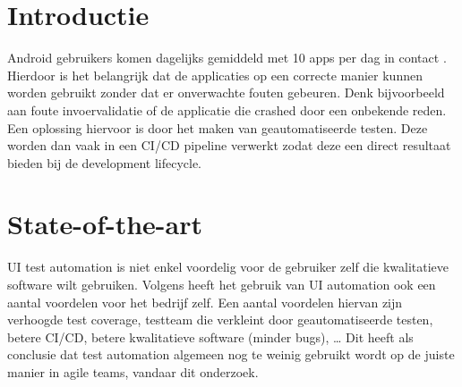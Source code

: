 \newcommand{\uiTestAut}{UI test automation}



\section{Introductie}%
\label{sec:introductie}

Android gebruikers komen dagelijks gemiddeld met 10 apps per dag in contact \autocite{PANKO2018}. 
Hierdoor is het belangrijk dat de applicaties op een correcte manier kunnen worden gebruikt zonder 
dat er onverwachte fouten gebeuren. Denk bijvoorbeeld aan foute invoervalidatie of
de applicatie die crashed door een onbekende reden.  %
Een oplossing hiervoor is door het maken van geautomatiseerde testen. Deze worden dan vaak in een CI/CD pipeline verwerkt zodat deze een 
direct resultaat bieden bij de development lifecycle.



\section{State-of-the-art}%
\label{sec:state-of-the-art}

UI test automation is niet enkel voordelig voor de gebruiker zelf die kwalitatieve software wilt gebruiken.
Volgens \textcite{Microfocus} heeft het gebruik van UI automation ook een aantal voordelen voor het bedrijf zelf.
Een aantal voordelen hiervan zijn verhoogde test coverage, testteam die verkleint door geautomatiseerde testen, 
betere CI/CD, betere kwalitatieve software (minder bugs), \dots{}
Dit heeft als conclusie dat test automation algemeen nog te weinig gebruikt wordt op de juiste manier in agile teams, vandaar dit onderzoek.

